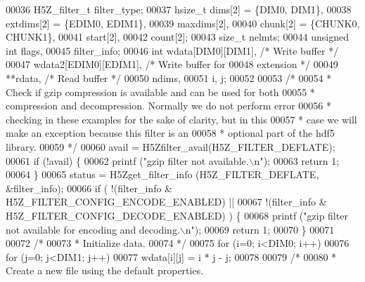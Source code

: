 \begin{DoxyCode}
00036     H5Z\_filter\_t    filter\_type;
00037     hsize\_t         dims[2] = \{DIM0, DIM1\},
00038                     extdims[2] = \{EDIM0, EDIM1\},
00039                     maxdims[2],
00040                     chunk[2] = \{CHUNK0, CHUNK1\},
00041                     start[2],
00042                     count[2];
00043     \textcolor{keywordtype}{size\_t}          nelmts;
00044     \textcolor{keywordtype}{unsigned} \textcolor{keywordtype}{int}    flags,
00045                     filter\_info;
00046     \textcolor{keywordtype}{int}             wdata[DIM0][DIM1],          \textcolor{comment}{/* Write buffer */}
00047                     wdata2[EDIM0][EDIM1],       \textcolor{comment}{/* Write buffer for}
00048 \textcolor{comment}{                                                   extension */}
00049                     **rdata,                    \textcolor{comment}{/* Read buffer */}
00050                     ndims,
00051                     i, j;
00052 
00053     \textcolor{comment}{/*}
00054 \textcolor{comment}{     * Check if gzip compression is available and can be used for both}
00055 \textcolor{comment}{     * compression and decompression.  Normally we do not perform error}
00056 \textcolor{comment}{     * checking in these examples for the sake of clarity, but in this}
00057 \textcolor{comment}{     * case we will make an exception because this filter is an}
00058 \textcolor{comment}{     * optional part of the hdf5 library.}
00059 \textcolor{comment}{     */}
00060     avail = H5Zfilter\_avail(H5Z\_FILTER\_DEFLATE);
00061     \textcolor{keywordflow}{if} (!avail) \{
00062         printf (\textcolor{stringliteral}{"gzip filter not available.\(\backslash\)n"});
00063         \textcolor{keywordflow}{return} 1;
00064     \}
00065     status = H5Zget\_filter\_info (H5Z\_FILTER\_DEFLATE, &filter\_info);
00066     \textcolor{keywordflow}{if} ( !(filter\_info & H5Z\_FILTER\_CONFIG\_ENCODE\_ENABLED) ||
00067                 !(filter\_info & H5Z\_FILTER\_CONFIG\_DECODE\_ENABLED) ) \{
00068         printf (\textcolor{stringliteral}{"gzip filter not available for encoding and decoding.\(\backslash\)n"});
00069         \textcolor{keywordflow}{return} 1;
00070     \}
00071 
00072     \textcolor{comment}{/*}
00073 \textcolor{comment}{     * Initialize data.}
00074 \textcolor{comment}{     */}
00075     \textcolor{keywordflow}{for} (i=0; i<DIM0; i++)
00076         \textcolor{keywordflow}{for} (j=0; j<DIM1; j++)
00077             wdata[i][j] = i * j - j;
00078 
00079     \textcolor{comment}{/*}
00080 \textcolor{comment}{     * Create a new file using the default properties.}

\end{DoxyCode}
